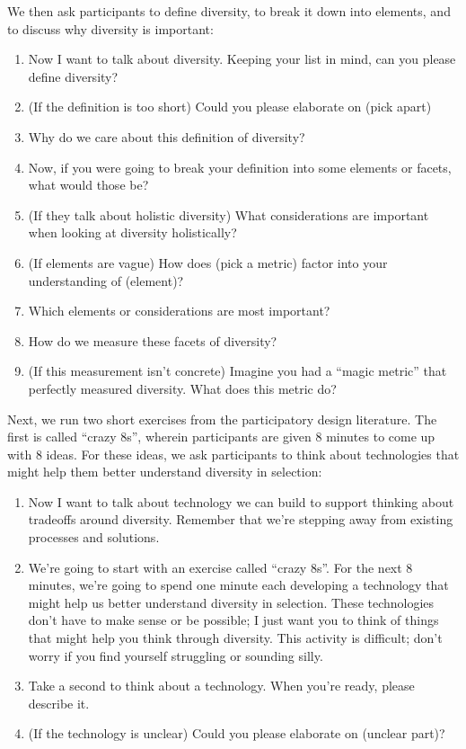 We then ask participants to define diversity, to break it down into elements, and to discuss why diversity is important:

\begin{enumerate}
    \item Now I want to talk about diversity. Keeping your list in mind, can you please define diversity?
    \item (If the definition is too short) Could you please elaborate on (pick apart)
    \item Why do we care about this definition of diversity?
    \item Now, if you were going to break your definition into some elements or facets, what would those be?
    \item (If they talk about holistic diversity) What considerations are important when looking at diversity holistically?
    \item (If elements are vague) How does (pick a metric) factor into your understanding of (element)?
    \item Which elements or considerations are most important?
    \item How do we measure these facets of diversity?
    \item (If this measurement isn't concrete) Imagine you had a ``magic metric'' that perfectly measured diversity. What does this metric do?
\end{enumerate}

Next, we run two short exercises from the participatory design literature. The first is called ``crazy 8s'', wherein participants are given 8 minutes to come up with 8 ideas. For these ideas, we ask participants to think about technologies that might help them better understand diversity in selection:

\begin{enumerate}
    \item Now I want to talk about technology we can build to support thinking about tradeoffs around diversity. Remember that we're stepping away from existing processes and solutions.
    \item We're going to start with an exercise called ``crazy 8s''. For the next 8 minutes, we're going to spend one minute each developing a technology that might help us better understand diversity in selection. These technologies don't have to make sense or be possible; I just want you to think of things that might help you think through diversity. This activity is difficult; don't worry if you find yourself struggling or sounding silly.
    \item Take a second to think about a technology. When you're ready, please describe it.
    \item (If the technology is unclear) Could you please elaborate on (unclear part)?
\end{enumerate}

